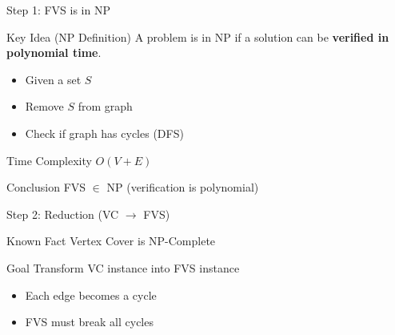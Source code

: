 \documentclass[aspectratio=169]{beamer}
\begin{document}
\begin{frame}{Step 1: FVS is in NP}

	\begin{block}{Key Idea (NP Definition)}
		A problem is in NP if a solution can be \textbf{verified in polynomial time}.
	\end{block}

	\vspace{0.3cm}

	\begin{itemize}
		\item Given a set $S$
		\item Remove $S$ from graph
		\item Check if graph has cycles (DFS)
	\end{itemize}

	\vspace{0.3cm}

	\begin{block}{Time Complexity}
		$O(V + E)$
	\end{block}

	\vspace{0.3cm}

	\begin{alertblock}{Conclusion}
		FVS $\in$ NP (verification is polynomial)
	\end{alertblock}

\end{frame}

\begin{frame}{Step 2: Reduction (VC $\rightarrow$ FVS)}

	\begin{block}{Known Fact}
		Vertex Cover is NP-Complete
	\end{block}

	\vspace{0.3cm}

	\begin{block}{Goal}
		Transform VC instance into FVS instance
	\end{block}

	\vspace{0.3cm}

	\begin{itemize}
		\item Each edge becomes a cycle
		\item FVS must break all cycles
	\end{itemize}

\end{frame}
\end{document}
